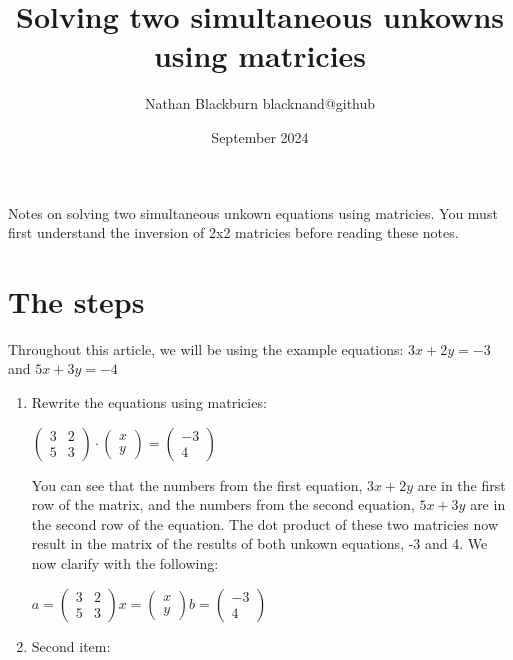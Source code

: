 \documentclass[options]{article}
\title{Solving two simultaneous unkowns using matricies}
\author{Nathan Blackburn {blacknand@github}}
\date{September 2024}
\begin{document}
\maketitle
Notes on solving two simultaneous unkown equations using matricies. You must first understand the inversion of 2x2 matricies before reading these notes.

\section{The steps}
Throughout this article, we will be using the example equations: \(3x + 2y = -3\) and \(5x + 3y = -4\)
\begin{enumerate}
    \item Rewrite the equations using matricies:
        \begin{center}
            \(
                \begin{pmatrix}
                    3 & 2\\
                    5 & 3
                \end{pmatrix}
                \cdot
                \begin{pmatrix}
                    x \\y
                \end{pmatrix}
                =
                \begin{pmatrix}
                    -3\\
                    4
                \end{pmatrix}
            \)
        \end{center}
        You can see that the numbers from the first equation, \(3x + 2y\) are in the first row of the matrix, and the numbers
        from the second equation, \(5x + 3y\) are in the second row of the equation. The dot product of these two matricies now result
        in the matrix of the results of both unkown equations, -3 and 4. We now clarify with the following:
        \begin{center}
            \(
                a = 
                \begin{pmatrix}
                    3 & 2\\
                    5 & 3
                \end{pmatrix}
                x =
                \begin{pmatrix}
                    x \\y
                \end{pmatrix}
                b =
                \begin{pmatrix}
                    -3\\
                    4
                \end{pmatrix}
            \)
        \end{center}
    \item Second item:
    

\end{enumerate}
\end{document}
